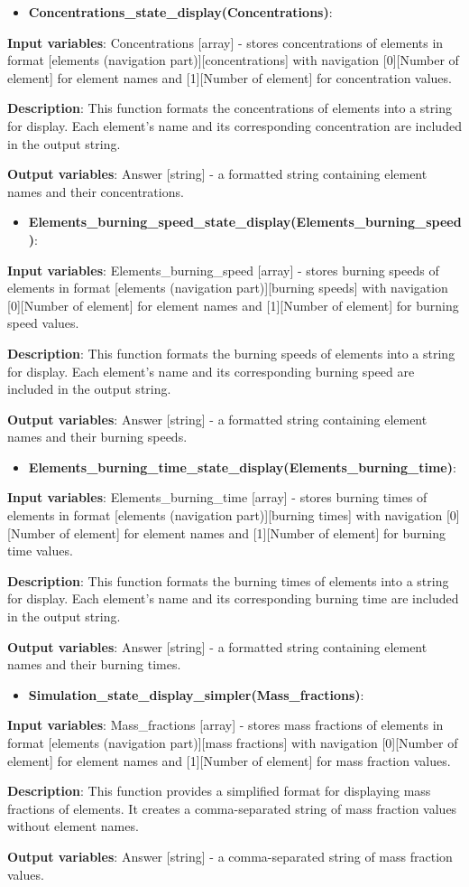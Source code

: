 \documentclass[a4paper,12pt]{article}
\newcommand{\namefunction}[4]{
  \begin{itemize}
    \item \textbf{#1}:
  \end{itemize}
  
  \textbf{Input variables}: #2.
  
  \textbf{Description}: #3.
  
  \textbf{Output variables}: #4.
}
\begin{document}
\vspace{1em}

\namefunction{Concentrations\_state\_display(Concentrations)}{Concentrations [array] - stores concentrations of elements in format [elements (navigation part)][concentrations] with navigation [0][Number of element] for element names and [1][Number of element] for concentration values}{This function formats the concentrations of elements into a string for display. Each element's name and its corresponding concentration are included in the output string}{Answer [string] - a formatted string containing element names and their concentrations}

\vspace{1em}

\namefunction{Elements\_burning\_speed\_state\_display(Elements\_burning\_speed)}{Elements\_burning\_speed [array] - stores burning speeds of elements in format [elements (navigation part)][burning speeds] with navigation [0][Number of element] for element names and [1][Number of element] for burning speed values}{This function formats the burning speeds of elements into a string for display. Each element's name and its corresponding burning speed are included in the output string}{Answer [string] - a formatted string containing element names and their burning speeds}

\vspace{1em}

\namefunction{Elements\_burning\_time\_state\_display(Elements\_burning\_time)}{Elements\_burning\_time [array] - stores burning times of elements in format [elements (navigation part)][burning times] with navigation [0][Number of element] for element names and [1][Number of element] for burning time values}{This function formats the burning times of elements into a string for display. Each element's name and its corresponding burning time are included in the output string}{Answer [string] - a formatted string containing element names and their burning times}

\vspace{1em}

\namefunction{Simulation\_state\_display\_simpler(Mass\_fractions)}{Mass\_fractions [array] - stores mass fractions of elements in format [elements (navigation part)][mass fractions] with navigation [0][Number of element] for element names and [1][Number of element] for mass fraction values}{This function provides a simplified format for displaying mass fractions of elements. It creates a comma-separated string of mass fraction values without element names}{Answer [string] - a comma-separated string of mass fraction values}
\end{document}
